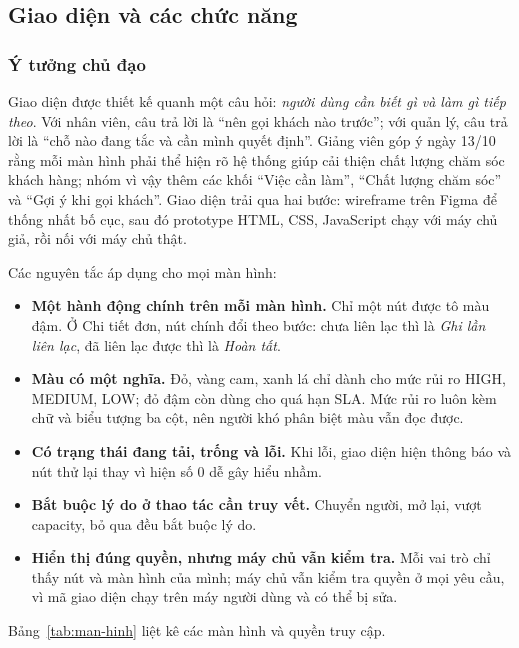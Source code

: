 \subsection{Giao diện và các chức năng}

\subsubsection{Ý tưởng chủ đạo}

Giao diện được thiết kế quanh một câu hỏi: \textit{người dùng cần biết gì và làm gì tiếp theo}. Với
nhân viên, câu trả lời là ``nên gọi khách nào trước''; với quản lý, câu trả lời là ``chỗ nào đang
tắc và cần mình quyết định''. Giảng viên góp ý ngày 13/10 rằng mỗi màn hình phải thể hiện rõ hệ
thống giúp cải thiện chất lượng chăm sóc khách hàng; nhóm vì vậy thêm các khối ``Việc cần làm'',
``Chất lượng chăm sóc'' và ``Gợi ý khi gọi khách''. Giao diện trải qua hai bước: wireframe trên Figma
để thống nhất bố cục, sau đó prototype HTML, CSS, JavaScript chạy với máy chủ giả, rồi nối với máy
chủ thật.

Các nguyên tắc áp dụng cho mọi màn hình:

\begin{itemize}
    \item \textbf{Một hành động chính trên mỗi màn hình.} Chỉ một nút được tô màu đậm. Ở Chi tiết đơn,
    nút chính đổi theo bước: chưa liên lạc thì là \textit{Ghi lần liên lạc}, đã liên lạc được thì là
    \textit{Hoàn tất}.
    \item \textbf{Màu có một nghĩa.} Đỏ, vàng cam, xanh lá chỉ dành cho mức rủi ro HIGH, MEDIUM, LOW;
    đỏ đậm còn dùng cho quá hạn SLA. Mức rủi ro luôn kèm chữ và biểu tượng ba cột, nên người khó phân
    biệt màu vẫn đọc được.
    \item \textbf{Có trạng thái đang tải, trống và lỗi.} Khi lỗi, giao diện hiện thông báo và nút thử
    lại thay vì hiện số 0 dễ gây hiểu nhầm.
    \item \textbf{Bắt buộc lý do ở thao tác cần truy vết.} Chuyển người, mở lại, vượt capacity, bỏ qua
    đều bắt buộc lý do.
    \item \textbf{Hiển thị đúng quyền, nhưng máy chủ vẫn kiểm tra.} Mỗi vai trò chỉ thấy nút và màn
    hình của mình; máy chủ vẫn kiểm tra quyền ở mọi yêu cầu, vì mã giao diện chạy trên máy người dùng
    và có thể bị sửa.
\end{itemize}

Bảng~\ref{tab:man-hinh} liệt kê các màn hình và quyền truy cập.

